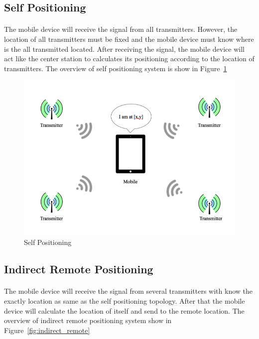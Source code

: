 \newpage
\subsection{Self Positioning}
\paragraph{}The mobile device will receive the signal from all transmitters. However, the location of all transmitters must be fixed and the mobile device must know where is the all transmitted located. After receiving the signal, the mobile device will act like the center station to calculates its positioning according to the location of transmitters. The overview of self positioning system is show in Figure~\ref{fig:self_positioning}

\begin{figure}[h]
\centering
\includegraphics[scale = 0.6]{Image/selfpositioning.png}
\caption{Self Positioning}
\label{fig:self_positioning}
\end{figure}

\newpage
\subsection{Indirect Remote Positioning}
\paragraph{}The mobile device will receive the signal from several transmitters with know the exactly location as same as the self positioning topology. After that the mobile device will calculate the location of itself and send to the remote location. The overview of indirect remote positioning system show in Figure~\ref{fig:indirect_remote}

